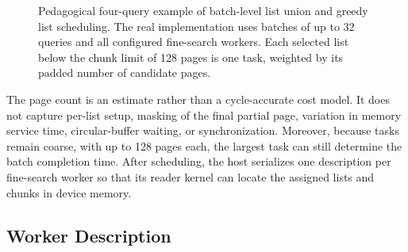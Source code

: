 \begin{figure}[htbp]
\centering
{}
\caption{Pedagogical four-query example of batch-level list union and greedy
list scheduling. The real implementation uses batches of up to 32 queries and
all configured fine-search workers. Each selected list below the chunk limit
of 128 pages is one task, weighted by its padded number of candidate pages.}
\label{fig:pedagogical-list-scheduling}
\end{figure}

The page count is an estimate rather than a cycle-accurate cost model. It does not capture per-list setup, masking of the final partial page, variation in memory service time, circular-buffer waiting, or synchronization. Moreover, because tasks remain coarse, with up to 128 pages each, the largest task can still determine the batch completion time. After scheduling, the host serializes one description per fine-search worker so that its reader kernel can locate the assigned lists and chunks in device memory.

\subsection{Worker Description}
\label{subsec:worker-description}

